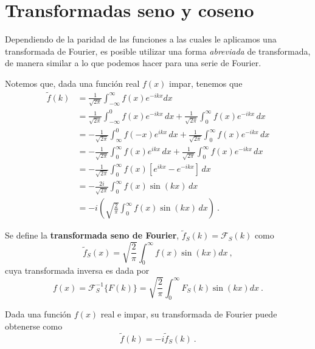 \section{Transformadas seno y coseno}

Dependiendo de la paridad de las funciones a las cuales le aplicamos una transformada de Fourier, es posible utilizar una forma \emph{abreviada} de transformada, de manera similar a lo que podemos hacer para una serie de Fourier.

Notemos que, dada una función real $f(x)$ impar, tenemos que
\begin{align*}
    \tilde{f}(k) & = \frac{1}{\sqrt{2\pi}} \int_{-\infty}^{\infty} f(x) e^{-ikx} dx \\
    & = \frac{1}{\sqrt{2\pi}}  \int_{-\infty}^0 f(x) e^{-ikx} \,dx + \frac{1}{\sqrt{2\pi}} \int_{0}^{\infty} f(x) e^{-ikx} \, dx  \\
    & = -\frac{1}{\sqrt{2\pi}}  \int_{\infty}^0 f(-x) e^{ikx} \,dx + \frac{1}{\sqrt{2\pi}}  \int_{0}^{\infty} f(x) e^{-ikx} \, dx \\
    & = -\frac{1}{\sqrt{2\pi}} \int_{0}^{\infty} f(x) e^{ikx} \,dx + \frac{1}{\sqrt{2\pi}}  \int_{0}^{\infty} f(x) e^{-ikx} \, dx  \\
     &= -\frac{1}{\sqrt{2\pi}}  \int_{0}^{\infty} f(x) [e^{ikx} - e^{-ikx}  ] \,dx \\
    & = -\frac{2i}{\sqrt{2\pi}}  \int_{0}^{\infty} f(x) \sin(kx) \,dx \\
    & = -i \left(\sqrt{\frac{2}{\pi}}  \int_{0}^{\infty} f(x) \sin(kx) \,dx \right) \ .
\end{align*}

\begin{defi}
    Se define la \textbf{transformada seno de Fourier}, $\tilde{f}_S(k) = \mathcal{F}_S(k)$ como
    \begin{equation}
        \tilde{f}_S(x) = \sqrt{\frac{2}{\pi}} \int_0^\infty f(x) \sin(kx) dx \ ,
    \end{equation}
    cuya transformada inversa es dada por
    \begin{equation}
        f(x) = \mathcal{F}^{-1}_S\{F(k)\} = \sqrt{\frac{2}{\pi}} \int_0^\infty F_S(k) \sin(kx) dx \ .
    \end{equation}

    Dada una función $f(x)$ real e impar, su transformada de Fourier puede obtenerse como
    \begin{equation*}
        \tilde{f}(k) = -i \tilde{f}_S(k) \ .
    \end{equation*}
\end{defi}

